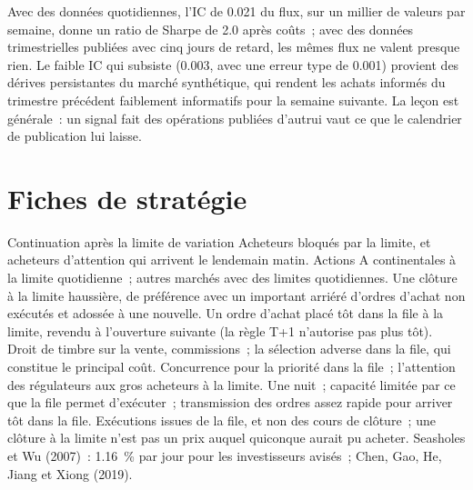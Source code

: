 Avec des données quotidiennes, l'IC de 0.021 du flux, sur un millier de valeurs par semaine, donne un ratio de Sharpe de 2.0 après coûts~; avec des données trimestrielles publiées avec cinq jours de retard,
les mêmes flux ne valent presque rien. Le faible IC qui subsiste (0.003, avec une erreur type de 0.001) provient des dérives
persistantes du marché synthétique, qui rendent les achats informés du trimestre précédent faiblement informatifs pour la semaine suivante. La leçon est générale~: un signal fait des
opérations publiées d'autrui vaut ce que le calendrier de publication lui laisse.

\section{Fiches de stratégie}

\begin{strategyfile}{Continuation après la limite de variation}\label{strat:s1:asia-specific-equity-strategies:limit}
 Acheteurs bloqués par la limite, et acheteurs d'attention qui arrivent le lendemain matin.
 Actions A continentales à la limite quotidienne~; autres marchés avec des limites quotidiennes.
 Une clôture à la limite haussière, de préférence avec un important arriéré d'ordres d'achat non exécutés et adossée à une nouvelle.
 Un ordre d'achat placé tôt dans la file à la limite, revendu à l'ouverture suivante (la règle T+1 n'autorise pas plus tôt).
 Droit de timbre sur la vente, commissions~; la sélection adverse dans la file, qui constitue le principal coût.
 Concurrence pour la priorité dans la file~; l'attention des régulateurs aux gros acheteurs à la limite.
 Une nuit~; capacité limitée par ce que la file permet d'exécuter~; transmission des ordres assez rapide pour arriver tôt dans la file.
 Exécutions issues de la file, et non des cours de clôture~; une clôture à la limite n'est pas un prix auquel quiconque aurait pu acheter.
 Seasholes et Wu (2007)~: 1.16~\% par jour pour les investisseurs avisés~; Chen, Gao, He, Jiang et Xiong (2019).
\end{strategyfile}

